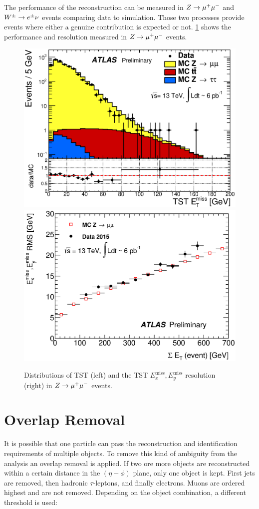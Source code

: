 The performance of the \etmiss{} reconstruction can be measured in $Z \to \mu^+\mu^-$ and $W^\pm \to e^\pm \nu$
events comparing data to simulation. Those two processes provide events where either a genuine \etmiss{} contribution
is expected or not.
\cref{fig:object_selection:etmiss} shows the performance and resolution measured in $Z \to \mu^+\mu^-$ events.

\begin{figure}[htb]
    \begin{center}
        \includegraphics[width=0.45\linewidth]{./figures/object_selection/etmiss_performance_tst_zmm.eps}
        \includegraphics[width=0.45\linewidth]{./figures/object_selection/etmiss_resolution_tst_zmm.eps}
        \caption{Distributions of TST \etmiss{} (left) and the TST $E^\text{miss}_x, E^\text{miss}_y$ resolution (right)
        in $Z \to \mu^+\mu^-$ events.~\cite{ATL-PHYS-PUB-2015-027}}
        \label{fig:object_selection:etmiss}
    \end{center}
\end{figure}

\section{Overlap Removal}\label{sec:object_selection:overlap_removal}

It is possible that one particle can pass the reconstruction and identification requirements of multiple objects.
To remove this kind of ambiguity from the analysis an overlap removal is applied.
If two ore more objects are reconstructed within a certain distance \dr{} in the $(\eta - \phi)$ plane, only one object is kept.
First jets are removed, then hadronic $\tau$-leptons, and finally electrons.
Muons are ordered highest and are not removed.
Depending on the object combination, a different \dr{} threshold is used:

